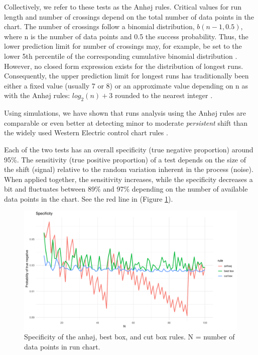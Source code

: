 Collectively, we refer to these tests as the Anhøj rules. Critical
values for run length and number of crossings depend on the total number
of data points in the chart. The number of crossings follow a binomial
distribution, \(b(n - 1, 0.5)\), where n is the number of data points
and 0.5 the success probability. Thus, the lower prediction limit for
number of crossings may, for example, be set to the lower 5th percentile
of the corresponding cumulative binomial distribution \citep{chen2010}.
However, no closed form expression exists for the distribution of
longest runs. Consequently, the upper prediction limit for longest runs
has traditionally been either a fixed value (usually 7 or 8)
\citep{carey2002a} or an approximate value depending on n as with the
Anhøj rules: \(log_2(n) + 3\) rounded to the nearest integer
\citep{schilling2012}.

Using simulations, we have shown that runs analysis using the Anhøj
rules are comparable or even better at detecting minor to moderate
\emph{persistent} shift than the widely used Western Electric control
chart rules \citep{anhoej2018}.

Each of the two tests has an overall specificity (true negative
proportion) around 95\%. The sensitivity (true positive proportion) of a
test depends on the size of the shift (signal) relative to the random
variation inherent in the process (noise). When applied together, the
sensitivity increases, while the specificity decreases a bit and
fluctuates between 89\% and 97\% depending on the number of available
data points in the chart. See the red line in (Figure
\ref{figure:spec}).

\begin{figure}[htbp]
  \centering
  \includegraphics[width=\textwidth]{fig_spec.pdf}
  \caption{Specificity of the anhøj, best box, and cut box rules. N = number of data points in run chart. }
  \label{figure:spec}
\end{figure}


